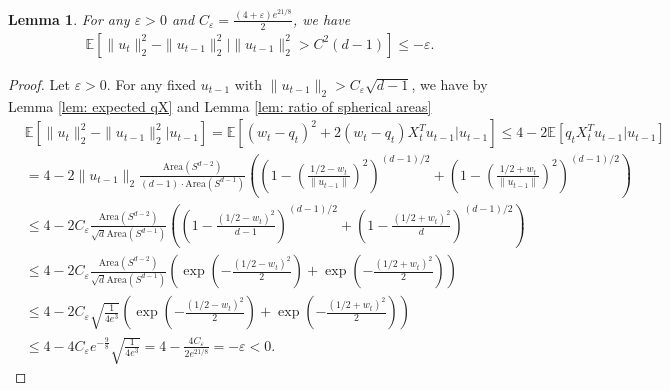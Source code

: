 \documentclass[journal,onecolumn,11pt,final]{IEEEtran}
\newcommand{\1}{\mathbb{1}}
\newcommand{\eps}{\varepsilon}
\theoremstyle{plain}
\theoremstyle{definition}
\theoremstyle{plain}
\theoremstyle{plain}
\newtheorem{lemma}[theorem]{Lemma}
\theoremstyle{definition}
\newcommand{\E}{\mathbb{E}}
\begin{document}
\begin{lemma} \label{lem: conditionally supermartingale}
	For any \(\eps > 0\) and \(C_{\eps} =  \frac{(4+\eps)e^{21/8}}{2}\), we have
	\begin{align*}
		\E\left[\|u_t\|_2^2 - \|u_{t-1}\|_2^2 \Big| \|u_{t-1}\|_2^2 > C^2 (d-1) \right] \leq -\eps.
	\end{align*}
\end{lemma}
\begin{proof}
	Let \(\eps > 0\). For any fixed \(u_{t-1}\) with \(\|u_{t-1}\|_2 > C_{\eps}\sqrt{d-1}\), we have by Lemma \ref{lem: expected qX} and Lemma \ref{lem: ratio of spherical areas}
	\begin{align*}
		&\E\left[\|u_t\|_2^2 - \|u_{t-1}\|_2^2 \Big| u_{t-1} \right] = \E\left[ (w_t - q_t)^2 + 2(w_t - q_t)X_t^T u_{t-1}  \Big| u_{t-1} \right] \leq 4 - 2 \E\left[q_tX_t^T u_{t-1}  \Big| u_{t-1}\right]\\
		&= 4 - 2 \|u_{t-1}\|_2 \frac{\mathrm{Area}(S^{d-2})}{(d-1) \cdot \mathrm{Area}(S^{d-1})}  \left(\left(1 - \left(\frac{1/2 - w_t}{\|u_{t-1}\|}\right)^2 \right)^{(d-1)/2} + \left(1 - \left(\frac{1/2 + w_t}{\|u_{t-1}\|}\right)^2 \right)^{(d-1)/2} \right)\\
		&\leq 4 - 2 C_{\eps}\frac{\mathrm{Area}(S^{d-2})}{\sqrt{d}\mathrm{Area}(S^{d-1})}  \left(\left(1 - \frac{(1/2 - w_t)^2}{d-1} \right)^{(d-1)/2} + \left(1 - \frac{(1/2 + w_t)^2}{d} \right)^{(d-1)/2} \right)\\
		&\leq 4 - 2 C_{\eps}\frac{\mathrm{Area}(S^{d-2})}{\sqrt{d}\mathrm{Area}(S^{d-1})}  \left(\exp\left( - \frac{(1/2-w_t)^2}{2}\right) + \exp\left( - \frac{(1/2+w_t)^2}{2} \right)\right)\\
		&\leq 4 - 2C_{\eps} \sqrt{\frac{1}{4e^3}} \left(\exp\left( - \frac{(1/2-w_t)^2}{2}\right) + \exp\left( - \frac{(1/2+w_t)^2}{2} \right)\right) \\
		& \leq 4 - 4 C_{\eps}e^{-\frac{9}{8}} \sqrt{\frac{1}{4e^3}} = 4 - \frac{4 C_{\eps}}{2e^{21/8}} = -\eps < 0.
	\end{align*}
\end{proof}
\end{document}
